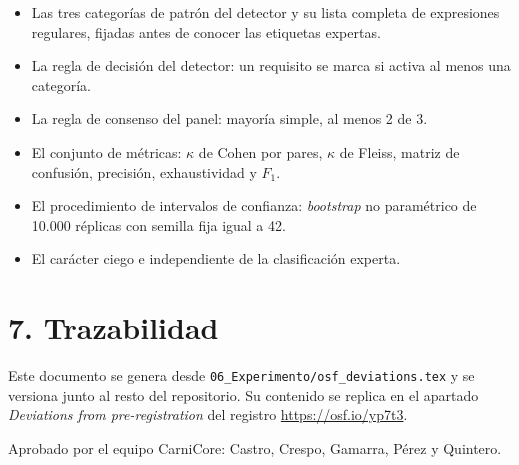 \documentclass[11pt,a4paper]{article}
\begin{document}
\begin{itemize}
\item Las tres categorías de patrón del detector y su lista completa de
      expresiones regulares, fijadas antes de conocer las etiquetas expertas.
\item La regla de decisión del detector: un requisito se marca si activa al
      menos una categoría.
\item La regla de consenso del panel: mayoría simple, al menos 2 de 3.
\item El conjunto de métricas: $\kappa$ de Cohen por pares, $\kappa$ de Fleiss,
      matriz de confusión, precisión, exhaustividad y $F_1$.
\item El procedimiento de intervalos de confianza: \textit{bootstrap} no
      paramétrico de 10.000 réplicas con semilla fija igual a 42.
\item El carácter ciego e independiente de la clasificación experta.
\end{itemize}

\section*{7. Trazabilidad}

Este documento se genera desde \texttt{06\_Experimento/osf\_deviations.tex} y
se versiona junto al resto del repositorio. Su contenido se replica en el
apartado \textit{Deviations from pre-registration} del registro
\url{https://osf.io/yp7t3}.

\vspace{10pt}
\noindent
Aprobado por el equipo CarniCore: Castro, Crespo, Gamarra, Pérez y Quintero.
\end{document}
